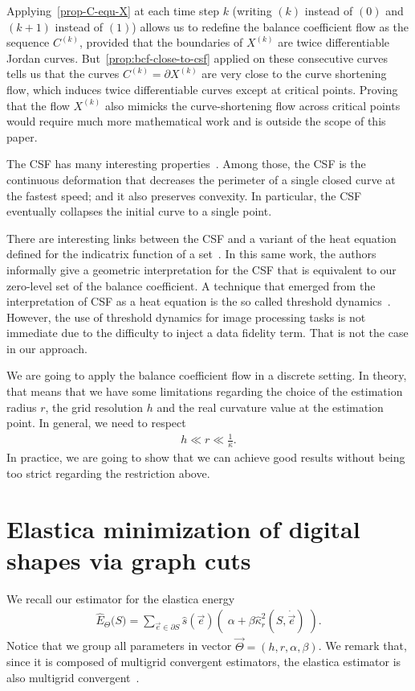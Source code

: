 \documentclass[review]{siamart220329}
\begin{document}
Applying~\cref{prop-C-equ-X} at each time step $k$ (writing
$(k)$ instead of $(0)$ and $(k+1)$ instead of $(1)$) allows us to
redefine the balance coefficient flow as the sequence $C^{(k)}$,
provided that the boundaries of $X^{(k)}$ are twice differentiable
Jordan curves. But~\cref{prop:bcf-close-to-csf} applied on
these consecutive curves tells us that the curves $C^{(k)}=\partial
X^{(k)}$ are very close to the curve shortening flow, which induces
twice differentiable curves except at critical points. Proving that
the flow $X^{(k)}$ also mimicks the curve-shortening flow across
critical points would require much more mathematical work and is
outside the scope of this paper.

The CSF has many interesting properties~\cite{huisken84flow,gage86heat,ecker2008heat}. Among those, the CSF is the continuous deformation that decreases the perimeter of a single closed curve at the fastest speed; and it also preserves convexity. In particular, the CSF eventually collapses the initial curve to a single point.

There are interesting links between the CSF and a variant of the heat equation defined for the indicatrix function of a set~\cite{merriman1992diffusion}. In this same work, the authors informally give a geometric interpretation for the CSF that is equivalent to our zero-level set of the balance coefficient. A technique that emerged from the interpretation of CSF as a heat equation is the so called threshold dynamics~\cite{esedoglu2005threshold,esedoglu2008threshold}. However, the use of threshold dynamics for image processing tasks is not immediate due to the difficulty to inject a data fidelity term. That is not the case in our approach.

We are going to apply the balance coefficient flow in a discrete setting. In theory, that means that we have some limitations regarding the choice of the estimation radius $r$, the grid resolution $h$ and the real curvature value at the estimation point. In general, we need to respect
%
%
\begin{align*}
	h \ll r \ll \frac{1}{\kappa}.
\end{align*}
%
%
In practice, we are going to show that we can achieve good results without being too strict regarding the restriction above.
%
%
%
%
\section{Elastica minimization of digital shapes via graph cuts}
We recall our estimator for the elastica energy 
%
\begin{align}
	\hat{E}_{\Theta}\big( S \big) = \sum_{\vec{e} \in \partial S}{ \hat{s}(\vec{e})\left(\; \alpha + \beta \hat{\kappa}_{r}^2(S,\dot{\vec{e}}) \; \right)}.
	\label{eq:elastica-estimator-2}
\end{align}
%
%
Notice that we group all parameters in vector $\vec{\Theta}=(h,r,\alpha,\beta)$. We remark that, since it is composed of multigrid convergent estimators, the elastica estimator is also multigrid convergent~\cite{lachaud06hdr}.
\end{document}
